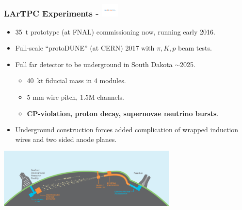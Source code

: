\documentclass[xcolor=dvipsnames]{beamer}
\begin{document}
\begin{frame}[fragile]
  \frametitle{LArTPC Experiments - \includegraphics[height=7mm,trim=4cm 9.2cm 4cm 9.3cm,clip,valign=c]{DUNElogo_colorHORIZONTAL.pdf}}
  \begin{itemize}\footnotesize
  \item \SI{35}{\tonne} prototype (at FNAL) commissioning now, running early 2016.
  \item Full-scale ``protoDUNE'' (at CERN) 2017 with $\pi, K, p$ beam tests.
  \item Full far detector to be underground in South Dakota $\sim$2025.
    \begin{itemize}
    \item \SI{40}{\kilo\tonne} fiducial mass in 4 modules.
    \item 5 mm wire pitch, 1.5M channels.
    \item \textbf{CP-violation, proton decay, supernovae neutrino bursts}.
    \end{itemize}
  \item Underground construction forces added complication of wrapped
    induction wires and two sided anode planes.
  \end{itemize}

  \begin{center}
    \includegraphics[height=3cm]{LBNF_Graphic_021715-1024x340.png}
  \end{center}

\end{frame}
\end{document}
